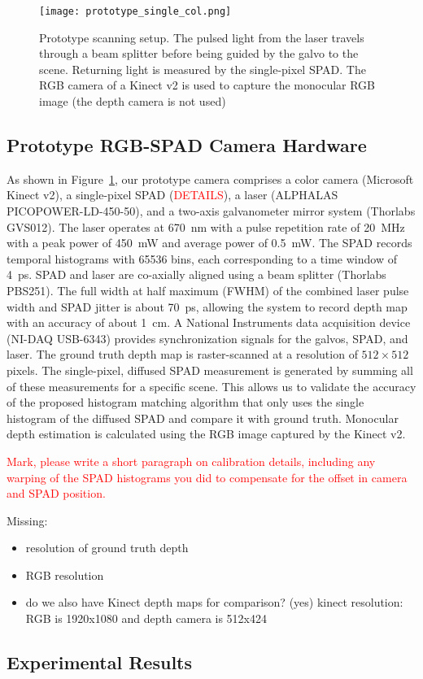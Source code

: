 \begin{figure}[H]
  \texttt{[image: prototype\_single\_col.png]}
  \caption{Prototype scanning setup. The pulsed light from the laser travels
    through a beam splitter before being guided by the galvo to the scene.
    Returning light is measured by the single-pixel SPAD. The RGB camera of a
    Kinect v2 is used to capture the monocular RGB image (the depth camera is
    not used)}
  \label{fig:prototype}
\end{figure}

\subsection{Prototype RGB-SPAD Camera Hardware}


As shown in Figure~\ref{fig:prototype}, our prototype camera comprises a color camera (Microsoft Kinect v2), a single-pixel SPAD (\textcolor{red}{DETAILS}), a laser (ALPHALAS PICOPOWER-LD-450-50), and a two-axis galvanometer mirror system (Thorlabs GVS012). The laser operates at 670~nm with a pulse repetition rate of 20~MHz with a peak power of 450~mW and average power of 0.5~mW. The SPAD records temporal histograms with 65536 bins, each corresponding to a time window of 4~ps. SPAD and laser are co-axially aligned using a beam splitter (Thorlabs PBS251). The full width at half maximum (FWHM) of the combined laser pulse width and SPAD jitter is about 70~ps, allowing the system to record depth map with an accuracy of about 1~cm. A National Instruments data acquisition device (NI-DAQ USB-6343) provides synchronization signals for the galvos, SPAD, and laser. The ground truth depth map is raster-scanned at a resolution of $512 \times 512$ pixels. The single-pixel, diffused SPAD measurement is generated by summing all of these measurements for a specific scene. This allows us to validate the accuracy of the proposed histogram matching algorithm that only uses the single histogram of the diffused SPAD and compare it with ground truth. Monocular depth estimation is calculated using the RGB image captured by the Kinect v2.

\textcolor{red}{Mark, please write a short paragraph on calibration details, including any warping of the SPAD histograms you did to compensate for the offset in camera and SPAD position.}

Missing:
%
\begin{itemize}
\item resolution of ground truth depth
\item RGB resolution
\item do we also have Kinect depth maps for comparison? (yes) kinect resolution: RGB is 1920x1080 and depth camera is 512x424
\end{itemize}

\subsection{Experimental Results}
